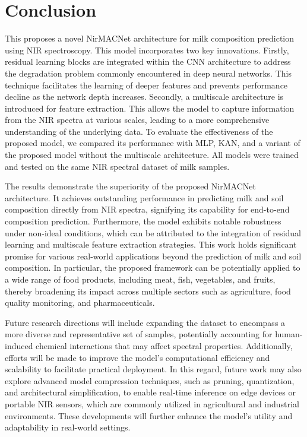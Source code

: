 \documentclass[10pt, a4paper, oneside]{article}
\begin{document}
\section{Conclusion}\label{sec4}
This proposes a novel NirMACNet architecture for milk composition prediction using NIR spectroscopy. This model incorporates two key innovations. Firstly, residual learning blocks are integrated within the CNN architecture to address the degradation problem commonly encountered in deep neural networks. This technique facilitates the learning of deeper features and prevents performance decline as the network depth increases. Secondly, a multiscale architecture is introduced for feature extraction. This allows the model to capture information from the NIR spectra at various scales, leading to a more comprehensive understanding of the underlying data. To evaluate the effectiveness of the proposed model, we compared its performance with MLP, KAN, and a variant of the proposed model without the multiscale architecture. All models were trained and tested on the same NIR spectral dataset of milk samples.
 
The results demonstrate the superiority of the proposed NirMACNet architecture. It achieves outstanding performance in predicting milk and soil composition directly from NIR spectra, signifying its capability for end-to-end composition prediction. Furthermore, the model exhibits notable robustness under non-ideal conditions, which can be attributed to the integration of residual learning and multiscale feature extraction strategies. This work holds significant promise for various real-world applications beyond the prediction of milk and soil composition. In particular, the proposed framework can be potentially applied to a wide range of food products, including meat, fish, vegetables, and fruits, thereby broadening its impact across multiple sectors such as agriculture, food quality monitoring, and pharmaceuticals.

Future research directions will include expanding the dataset to encompass a more diverse and representative set of samples, potentially accounting for human-induced chemical interactions that may affect spectral properties. Additionally, efforts will be made to improve the model’s computational efficiency and scalability to facilitate practical deployment. In this regard, future work may also explore advanced model compression techniques, such as pruning, quantization, and architectural simplification, to enable real-time inference on edge devices or portable NIR sensors, which are commonly utilized in agricultural and industrial environments. These developments will further enhance the model's utility and adaptability in real-world settings. 
\end{document}
